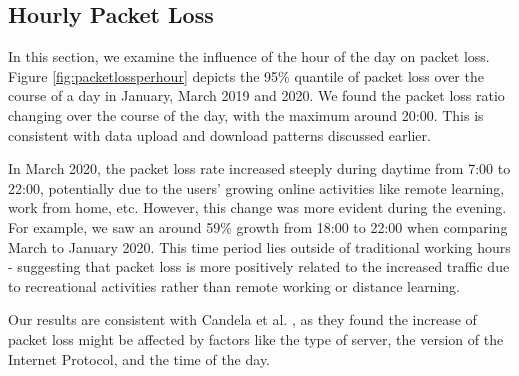 \subsection{Hourly Packet Loss}

In this section, we examine the influence of the hour of the day on packet loss. Figure \ref{fig:packetlossperhour} depicts the 95\% quantile of packet loss over the course of a day in January, March 2019 and 2020. We found the packet loss ratio changing over the course of the day, with the maximum around 20:00. This is consistent with data upload and download patterns discussed earlier.

In March 2020, the packet loss rate increased steeply during daytime from 7:00 to 22:00, potentially due to the users' growing online activities like remote learning, work from home, etc. However, this change was more evident during the evening. For example, we saw an around 59\% growth from 18:00 to 22:00 when comparing March to January 2020. This time period lies outside of traditional working hours - suggesting that packet loss is more positively related to the increased traffic due to recreational activities rather than remote working or distance learning.

Our results are consistent with Candela et al. \cite{Candela2020latency}, as they found the increase of packet loss might be affected by factors like the type of server, the version of the Internet Protocol, and the time of the day.

